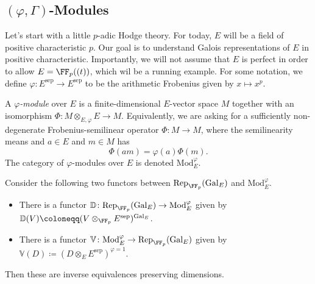\documentclass{article}
\begin{document}
\subsection{\texorpdfstring{$(\varphi,\Gamma)$}{(phi, Gamma)}-Modules}
Let's start with a little $p$-adic Hodge theory. For today, $E$ will be a field of positive characteristic $p$. Our goal is to understand Galois representations of $E$ in positive characteristic. Importantly, we will not assume that $E$ is perfect in order to allow $E=\FF_p((t))$, which wil be a running example. For some notation, we define $\varphi\colon E^{\mathrm{sep}}\to E^{\mathrm{sep}}$ to be the arithmetic Frobenius given by $x\mapsto x^p$.
\begin{definition}
	A \textit{$\varphi$-module} over $E$ is a finite-dimensional $E$-vector space $M$ together with an isomorphism $\Phi\colon M\otimes_{E,\varphi}E\to M$. Equivalently, we are asking for a sufficiently non-degenerate Frobenius-semilinear operator $\Phi\colon M\to M$, where the semilinearity means and $a\in E$ and $m\in M$ has
	\[\Phi(am)=\varphi(a)\Phi(m).\]
	The category of $\varphi$-modules over $E$ is denoted $\mathrm{Mod}_E^\varphi$.
\end{definition}
\begin{theorem} \label{thm:basic-phi-gamma}
	Consider the following two functors between $\mathrm{Rep}_{\FF_p}(\mathrm{Gal}_E)$ and $\mathrm{Mod}^\varphi_E$.
	\begin{itemize}
		\item There is a functor $\mathbb D\colon\mathrm{Rep}_{\FF_p}(\mathrm{Gal}_E)\to\mathrm{Mod}_E^\varphi$ given by $\mathbb D(V)\coloneqq(V\otimes_{\FF_p}E^{\mathrm{sep}})^{\mathrm{Gal}_E}$.
		\item There is a functor $\mathbb V\colon\mathrm{Mod}_E^\varphi\to\mathrm{Rep}_{\FF_p}(\mathrm{Gal}_E)$ given by $\mathbb V(D)\coloneqq(D\otimes_EE^{\mathrm{sep}})^{\varphi=1}$.
	\end{itemize}
	Then these are inverse equivalences preserving dimensions.
\end{theorem}
\end{document}
